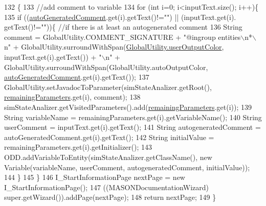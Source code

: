 \begin{DoxyCode}
132                                     \{ 
133         \textcolor{comment}{//add comment to variable}
134         \textcolor{keywordflow}{for} (\textcolor{keywordtype}{int} i=0; i<inputText.size(); i++)\{
135             \textcolor{keywordflow}{if} ((\hyperlink{classit_1_1isislab_1_1masonassisteddocumentation_1_1mason_1_1wizards_1_1_h___environment_page_a15a1e1e2224d71f7d9a10f962bbeee8f}{autoGeneratedComment}.get(i).getText()!=\textcolor{stringliteral}{""}) || (inputText.get(i).
      getText()!=\textcolor{stringliteral}{""}))\{   \textcolor{comment}{//if there is at least an autogenerated comment}
136                 String comment = GlobalUtility.COMMENT\_SIGNATURE + \textcolor{stringliteral}{"@ingroup entities\(\backslash\)n*\(\backslash\)n"} + 
      GlobalUtility.surroundWithSpan(\hyperlink{classit_1_1isislab_1_1masonassisteddocumentation_1_1mason_1_1analizer_1_1_global_utility_a0fcb324ae33eb93bd5b9177e342ecc82}{GlobalUtility.userOutputColor}, inputText.get(i).getText()) + \textcolor{stringliteral}{
      "\(\backslash\)n"} + GlobalUtility.surroundWithSpan(GlobalUtility.autoOutputColor, 
      \hyperlink{classit_1_1isislab_1_1masonassisteddocumentation_1_1mason_1_1wizards_1_1_h___environment_page_a15a1e1e2224d71f7d9a10f962bbeee8f}{autoGeneratedComment}.get(i).getText());
137                 GlobalUtility.setJavadocToParameter(simStateAnalizer.getRoot(), 
      \hyperlink{classit_1_1isislab_1_1masonassisteddocumentation_1_1mason_1_1wizards_1_1_h___environment_page_a5d9563244ed9f8e9a055d1678e29d4f2}{remainingParameters}.get(i), comment);
138                 simStateAnalizer.getVisitedParameters().add(\hyperlink{classit_1_1isislab_1_1masonassisteddocumentation_1_1mason_1_1wizards_1_1_h___environment_page_a5d9563244ed9f8e9a055d1678e29d4f2}{remainingParameters}.get(i));
139                 String variableName = remainingParameters.get(i).getVariableName();
140                 String userComment = inputText.get(i).getText();
141                 String autogeneratedComment = autoGeneratedComment.get(i).getText();
142                 String initialValue = remainingParameters.get(i).getInitializer();
143                 ODD.addVariableToEntity(simStateAnalizer.getClassName(), \textcolor{keyword}{new} Variable(variableName, 
      userComment, autogeneratedComment, initialValue));
144             \}
145         \}
146         I\_StartInformationPage nextPage = \textcolor{keyword}{new} I\_StartInformationPage();
147         ((MASONDocumentationWizard) super.getWizard()).addPage(nextPage);
148         \textcolor{keywordflow}{return} nextPage; 
149     \}
\end{DoxyCode}


